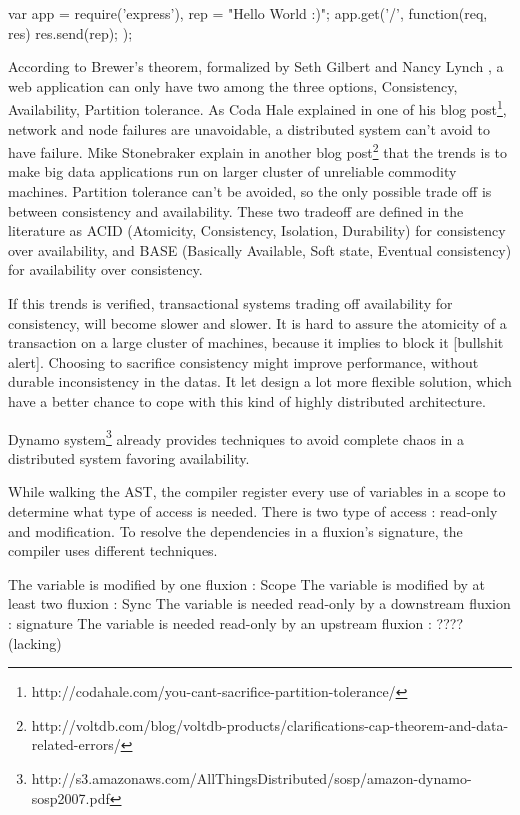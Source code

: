 \begin{code}[Javascript, caption={Hello World with a shared variable},label={lst:sharedhello}]
var app = require('express'),
    rep = "Hello World :)";
app.get('/', function(req, res) {
  res.send(rep);
});
\end{code}

According to Brewer's theorem, formalized by Seth Gilbert and Nancy Lynch \cite{Gilbert2002}, a web application can only have two among the three options, Consistency, Availability, Partition tolerance.
As Coda Hale explained in one of his blog post\footnote{http://codahale.com/you-cant-sacrifice-partition-tolerance/}, network and node failures are unavoidable, a distributed system can't avoid to have failure.
Mike Stonebraker explain in another blog post\footnote{http://voltdb.com/blog/voltdb-products/clarifications-cap-theorem-and-data-related-errors/} that the trends is to make big data applications run on larger cluster of unreliable commodity machines.
Partition tolerance can't be avoided, so the only possible trade off is between consistency and availability.
These two tradeoff are defined in the literature as ACID (Atomicity, Consistency, Isolation, Durability) for consistency over availability, and BASE (Basically Available, Soft state, Eventual consistency) for availability over consistency.

If this trends is verified, transactional systems trading off availability for consistency, will become slower and slower.
It is hard to assure the atomicity of a transaction on a large cluster of machines, because it implies to block it [bullshit alert].
Choosing to sacrifice consistency might improve performance, without durable inconsistency in the datas.
It let design a lot more flexible solution, which have a better chance to cope with this kind of highly distributed architecture.


Dynamo system\footnote{http://s3.amazonaws.com/AllThingsDistributed/sosp/amazon-dynamo-sosp2007.pdf} already provides techniques to avoid complete chaos in a distributed system favoring availability.





While walking the AST, the compiler register every use of variables in a scope to determine what type of access is needed.
There is two type of access : read-only and modification.
To resolve the dependencies in a fluxion's signature, the compiler uses different techniques.

The variable is modified by one fluxion : Scope
The variable is modified by at least two fluxion : Sync
The variable is needed read-only by a downstream fluxion : signature
The variable is needed read-only by an upstream fluxion : ???? (lacking)


